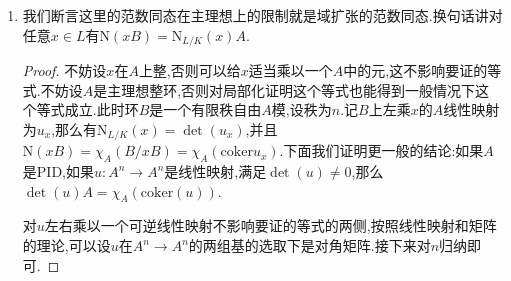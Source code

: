 \begin{enumerate}
\begin{proof}
		按照正合列的线性归结为证明$M=A/p$的情况,其中$p$是极大理想.此时$M_B=B/pB$,所以$\chi_B(M_B)=pB$,而按照定义$i(\chi_A(M))=i(p)=pB$.
	\end{proof}
	\item 我们断言这里的范数同态在主理想上的限制就是域扩张的范数同态.换句话讲对任意$x\in L$有$\mathrm{N}(xB)=\mathrm{N}_{L/K}(x)A$.
	\begin{proof}
		
		不妨设$x$在$A$上整,否则可以给$x$适当乘以一个$A$中的元,这不影响要证的等式.不妨设$A$是主理想整环,否则对局部化证明这个等式也能得到一般情况下这个等式成立.此时环$B$是一个有限秩自由$A$模,设秩为$n$.记$B$上左乘$x$的$A$线性映射为$u_x$,那么有$\mathrm{N}_{L/K}(x)=\det(u_x)$,并且$\mathrm{N}(xB)=\chi_A(B/xB)=\chi_A(\mathrm{coker}u_x)$.下面我们证明更一般的结论:如果$A$是PID,如果$u:A^n\to A^n$是线性映射,满足$\det(u)\not=0$,那么$\det(u)A=\chi_A(\mathrm{coker}(u))$.
		
		\qquad
		
		对$u$左右乘以一个可逆线性映射不影响要证的等式的两侧,按照线性映射和矩阵的理论,可以设$u$在$A^n\to A^n$的两组基的选取下是对角矩阵.接下来对$n$归纳即可.
	\end{proof}
\end{enumerate}

